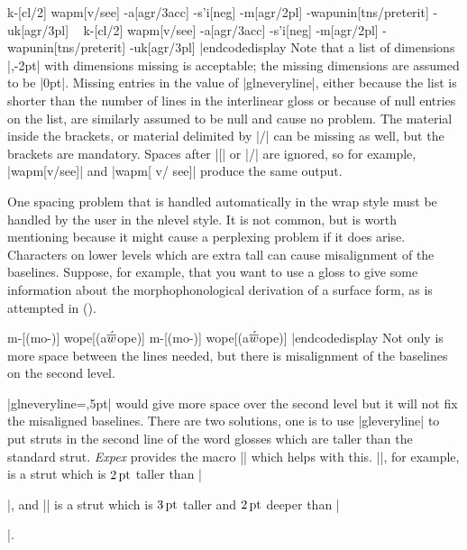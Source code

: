\framedisplay
\ex[glstyle=nlevel,glneveryline={\it,\sc,\sc},
   glnabovelineextraskip={,-2pt}]
\begingl
k-[cl/2]
wapm[v/\rm see]
-a[agr/3acc]
-s'i[neg]
-m[agr/\sc 2pl]
-wapunin[tns/preterit]
-uk[agr/3pl]
\endgl
\xe
\endframedisplay
\codedisplay~
\ex[glstyle=nlevel,glneveryline={\it,\sc,\sc},
   glnabovelineextraskip={,-2pt}]
\begingl
k-[cl/2]
wapm[v/\rm see]
-a[agr/3acc]
-s'i[neg]
-m[agr/\sc 2pl]
-wapunin[tns/preterit]
-uk[agr/3pl]
\endgl
\xe
|endcodedisplay
Note that a list of dimensions |{,-2pt}| with dimensions missing is
acceptable; the missing dimensions are assumed to be |0pt|.  Missing
entries in the value of |glneveryline|, either because the list is
shorter than the number of lines in the interlinear gloss or because
of null entries on the list, are similarly assumed to be null and
cause no problem.  The material inside the brackets, or material
delimited by |/| can be missing as well, but the brackets are
mandatory.  Spaces after |[| or |/| are ignored, so for example,
|wapm[v/\rm see]| and |wapm[ v/ \rm see]| produce the same output.

One spacing problem that is handled automatically in the wrap style
must be handled by the user in the nlevel style.  It is not common,
but is worth mentioning because it might cause a perplexing problem if
it does arise.  Characters on lower levels which are extra tall can
cause misalignment of the baselines.  Suppose, for example, that you
want to use a gloss to give some information about the
morphophonological derivation of a surface form, as is attempted
in (\nextx).

\def\AccentedBarredW{$\acute{\hbox{$\overline w$}}$}

\framedisplay
\ex[glstyle=nlevel,glneveryline={\it}]
\begingl m-[(mo-)] wope[(a\AccentedBarredW ope)] \endgl \xe
\endframedisplay
\codedisplay
\ex[glstyle=nlevel,glneveryline={\it}]
\begingl m-[(mo-)] wope[(a\AccentedBarredW ope)] \endgl \xe
|endcodedisplay
Not only is more space between the lines needed, but there is
misalignment of the baselines on the second level.

|glneveryline={,5pt}| would give more space over the second level but
it will not fix the misaligned baselines. There are two solutions,
one is to use |gleveryline| to put struts in the second line of the
word glosses which are taller than the standard strut.  {\it Expex}
provides the macro |\varstrut| which helps with this.
|\varstrut{2pt}|, for example, is a strut which is $2\,\rm pt$ taller
than |\strut|, and |\varstrut{3pt 2pt}| is a strut which is $3\,\rm
pt$ taller and $2\,\rm pt$ deeper than |\strut|.

